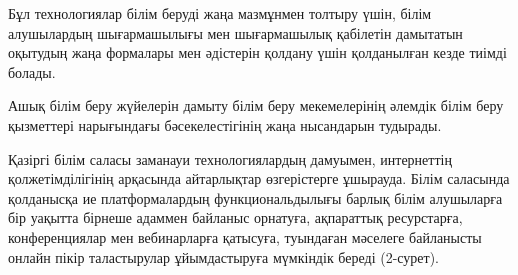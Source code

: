 % 
% 
% 
% 
% 
% 
% 
% 
% 

Бұл технологиялар білім беруді жаңа мазмұнмен толтыру үшін, білім
алушылардың шығармашылығы мен шығармашылық қабілетін дамытатын оқытудың
жаңа формалары мен әдістерін қолдану үшін қолданылған кезде тиімді
болады.

Ашық білім беру жүйелерін дамыту білім беру мекемелерінің әлемдік білім
беру қызметтері нарығындағы бәсекелестігінің жаңа нысандарын тудырады.

Қазіргі білім саласы заманауи технологиялардың дамуымен, интернеттің
қолжетімділігінің арқасында айтарлықтар өзгерістерге ұшырауда. Білім
саласында қолданысқа ие платформалардың функциональдылығы барлық білім
алушыларға бір уақытта бірнеше адаммен байланыс орнатуға, ақпараттық
ресурстарға, конференциялар мен вебинарларға қатысуға, туындаған
мәселеге байланысты онлайн пікір таластырулар ұйымдастыруға мүмкіндік
береді (2-сурет).

